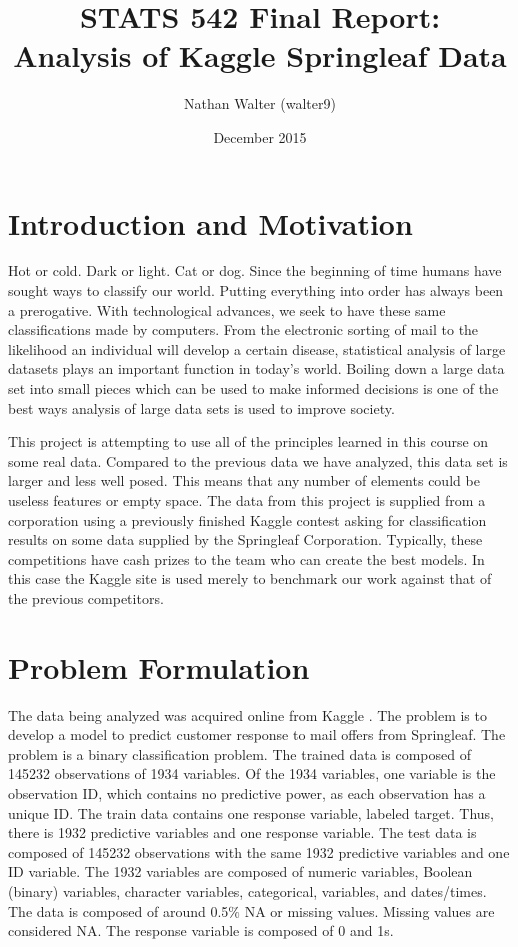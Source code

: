 \documentclass[aps, reprint, groupedaddress, superscriptaddress, amsmath, 10pt]{revtex4-1}
\begin{document}
	\large
	\title{STATS 542 Final Report: \\ Analysis of Kaggle Springleaf Data}
	\date{December 2015}
	\author{Nathan Walter (walter9)}
	\maketitle
	
	\section{Introduction and Motivation}
	Hot or cold.  Dark or light.  Cat or dog. Since the beginning of time humans have sought ways to classify our world.  Putting everything into order has always been a prerogative.  With technological advances, we seek to have these same classifications made by computers.  From the electronic sorting of mail to the likelihood an individual will develop a certain disease, statistical analysis of large datasets plays an important function in today's world.  Boiling down a large data set into small pieces which can be used to make informed decisions is one of the best ways analysis of large data sets is used to improve society.
		
	This project is attempting to use all of the principles learned in this course on some real data.  Compared to the previous data we have analyzed, this data set is larger and less well posed. This means that any number of elements could be useless features or empty space.  The data from this project is supplied from a corporation using a previously finished Kaggle contest asking for classification results on some data supplied by the Springleaf Corporation. Typically, these competitions have cash prizes to the team who can create the best models. In this case the Kaggle site is used merely to benchmark our work against that of the previous competitors. 
	
	
	\section{Problem Formulation}
	The data being analyzed was acquired online from Kaggle \cite{KAGGLE}.	The problem is to develop a model to predict customer response to mail offers from Springleaf.  The problem is a binary classification problem.  The trained data is composed of 145232 observations of 1934 variables.  Of the 1934 variables, one variable is the observation ID, which contains no predictive power, as each observation has a unique ID.  The train data contains one response variable, labeled target.  Thus, there is 1932 predictive variables and one response variable.  The test data is composed of 145232 observations with the same 1932 predictive variables and one ID variable.  The 1932 variables are composed of numeric variables, Boolean (binary) variables, character variables, categorical, variables, and dates/times.  The data is composed of around 0.5$\%$ NA or missing values.  Missing values are considered NA.  The response variable is composed of 0 and 1s.
	
\end{document}
